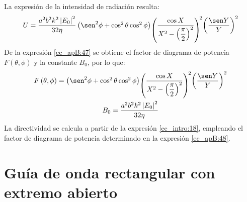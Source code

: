 La expresión de la intensidad de radiación resulta:
\begin{align}
\raisebox{2.31mm}{$U = \dfrac{a^2b^2k^2\left|E_0\right|^2}{32\eta}\left(\sen^2\phi + \cos^2\theta\cos^2\phi\right)$}\!\left(\raisebox{2.31mm}{$\dfrac{\cos X}{X^2 - \left(\dfrac{\pi}{2}\right)^2}$}\right)^{\!2}\!\raisebox{2.31mm}{$\left(\dfrac{\sen Y}{Y}\right)^2$}
\label{ec_apB:47}
\end{align}
De la expresión \eqref{ec_apB:47} se obtiene el factor de diagrama de potencia $F\left(\theta,\phi\right)$ y la constante $B_0$, por lo que:
\begin{gather}
\raisebox{2.31mm}{$F\left(\theta,\phi\right) = \left(\sen^2\phi + \cos^2\theta\cos^2\phi\right)$}\!\left(\raisebox{2.31mm}{$\dfrac{\cos X}{X^2 - \left(\dfrac{\pi}{2}\right)^2}$}\right)^{\!2}\!\raisebox{2.31mm}{$\left(\dfrac{\sen Y}{Y}\right)^2$}
\label{ec_apB:48}\\
B_0 = \frac{a^2b^2k^2\left|E_0\right|^2}{32\eta}
\label{ec_apB:49}
\end{gather}
La directividad se calcula a partir de la expresión \eqref{ec_intro:18}, empleando el factor de diagrama de potencia determinado en la expresión \eqref{ec_apB:48}.

\section{Guía de onda rectangular con extremo abierto}
\label{sec_apendice_b_guia_rect}

